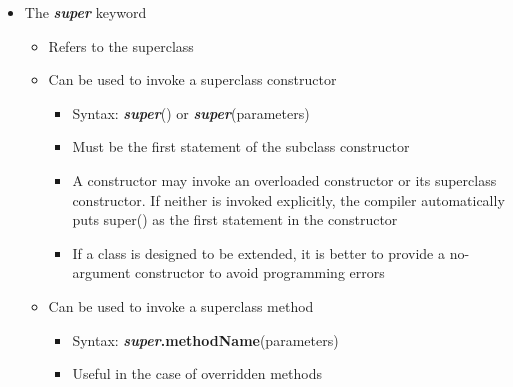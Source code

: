 \begin{itemize}
	\item The \textbf{\textit{super}} keyword
	\begin{itemize}
		\item Refers to the superclass
		\item Can be used to invoke a superclass constructor
		\begin{itemize}
			\item Syntax: \textbf{\textit{super}}() or \textbf{\textit{super}}(parameters)
			\item  Must be the first statement of the subclass constructor
			\item  A constructor may invoke an overloaded constructor or its superclass constructor. If neither is invoked explicitly, the compiler automatically puts super() as the first statement in the constructor
			\item  If a class is designed to be extended, it is better to provide a no-argument constructor to avoid programming errors
		\end{itemize}
		\item Can be used to invoke a superclass method
		\begin{itemize}
			\item Syntax: \textbf{\textit{super}.methodName}(parameters)
			\item Useful in the case of overridden methods
		\end{itemize}
	\end{itemize}


\end{itemize}

